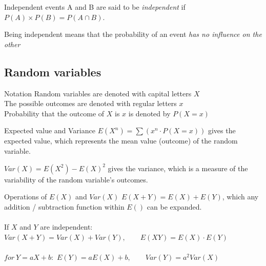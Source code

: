 \documentclass{article}
\begin{document}
\begin{definition}[]{Independent events}
    A and B are said to be \emph{independent} if $P(A) \times P(B) = P(A\cap B)$.

    Being independent means that the probability of an event \emph{has no influence on the other}
\end{definition}

\subsection{Random variables}
\begin{knBox}[]{Notation}
    Random variables are denoted with capital letters $X$\\
    The possible outcomes are denoted with regular letters $x$\\
    Probability that the outcome of $X$ is $x$ is denoted by $P(X=x)$
\end{knBox}
\begin{definition}[]{Expected value and Variance}
    $E(X^n)=\sum(x^n\cdot P(X=x))$ gives the expected value, which represents the mean value (outcome) of the random variable.

    $Var(X)=E(X^2)-E(X)^2$ gives the variance, which is a measure of the variability of the random variable's outcomes.
\end{definition}
\begin{definition}[]{Operations of $E(X)$ and $Var(X)$}
    $E(X+Y)=E(X)+E(Y)$, which any addition / subtraction function within $E()$ can be expanded.\\
    \\
    If $X$ and $Y$ are independent:
    $Var(X+Y) = Var(X) + Var(Y),\quad\quad E(XY)    = E(X)\cdot E(Y)$\\
    \\
    $for\ Y=aX+b:$ $E(Y)=aE(X)+b,\quad\quad Var(Y)=a^2Var(X)$

\end{definition}
\end{document}
